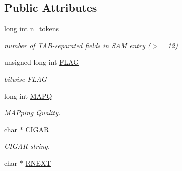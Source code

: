\subsection*{Public Attributes}
\begin{CompactItemize}
\item 
\hypertarget{classGenomicRegionSAM_281e35ef1bd0b7da811d9b8957f3d08f}{
long int \hyperlink{classGenomicRegionSAM_281e35ef1bd0b7da811d9b8957f3d08f}{n\_\-tokens}}
\label{classGenomicRegionSAM_281e35ef1bd0b7da811d9b8957f3d08f}

\begin{CompactList}\small\item\em number of TAB-separated fields in SAM entry ($>$= 12) \item\end{CompactList}\item 
\hypertarget{classGenomicRegionSAM_200d7f7044dd69311eceb851a3c315e5}{
unsigned long int \hyperlink{classGenomicRegionSAM_200d7f7044dd69311eceb851a3c315e5}{FLAG}}
\label{classGenomicRegionSAM_200d7f7044dd69311eceb851a3c315e5}

\begin{CompactList}\small\item\em bitwise FLAG \item\end{CompactList}\item 
\hypertarget{classGenomicRegionSAM_edacdd8319f4b614229a41b80d4c6f67}{
long int \hyperlink{classGenomicRegionSAM_edacdd8319f4b614229a41b80d4c6f67}{MAPQ}}
\label{classGenomicRegionSAM_edacdd8319f4b614229a41b80d4c6f67}

\begin{CompactList}\small\item\em MAPping Quality. \item\end{CompactList}\item 
\hypertarget{classGenomicRegionSAM_a5acff481ae565db4976e66933212726}{
char $\ast$ \hyperlink{classGenomicRegionSAM_a5acff481ae565db4976e66933212726}{CIGAR}}
\label{classGenomicRegionSAM_a5acff481ae565db4976e66933212726}

\begin{CompactList}\small\item\em CIGAR string. \item\end{CompactList}\item 
\hypertarget{classGenomicRegionSAM_f723505bfafff1a1fa616479023d0c3c}{
char $\ast$ \hyperlink{classGenomicRegionSAM_f723505bfafff1a1fa616479023d0c3c}{RNEXT}}
\label{classGenomicRegionSAM_f723505bfafff1a1fa616479023d0c3c}


\end{CompactItemize}
